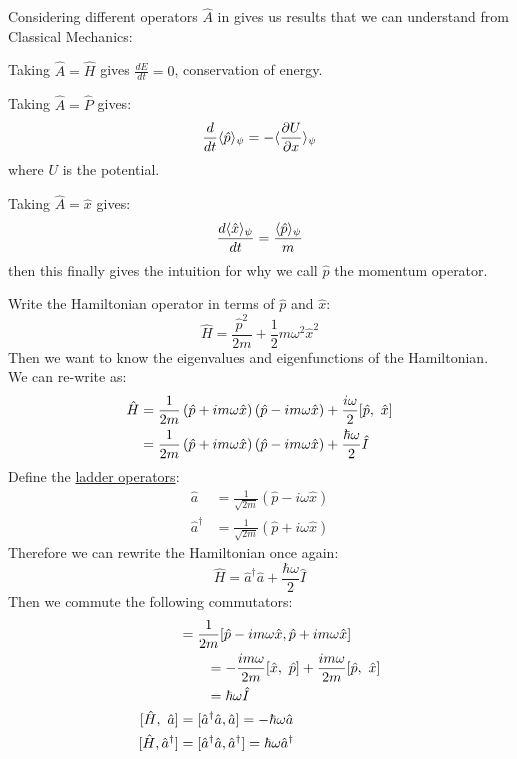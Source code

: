 \documentclass[../Main.tex]{subfiles}
\begin{document}
\begin{examples}{
        Considering different operators $\hat{A}$ in  gives us results that we can understand from Classical Mechanics:
    }
    \item Taking $\hat{A} = \hat{H}$ gives $\frac{dE}{dt} = 0$, conservation of energy.
    \item Taking $\hat{A} = \hat{P}$ gives:
        \begin{equation*}
            \frac{d}{dt} \langle \hat{p} \rangle_\psi = -\langle \frac{\partial U}{\partial x} \rangle_\psi
        \end{equation*}
        where $U$ is the potential.
    \item Taking $\hat{A} = \hat{x}$ gives:
        \begin{equation*}
            \frac{d\langle \hat{x} \rangle_\psi}{dt} = \frac{\langle \hat{p} \rangle_\psi}{m}
        \end{equation*}
        then this finally gives the intuition for why we call $\hat{p}$ the momentum operator.
\end{examples}
Write the Hamiltonian operator in terms of $\hat{p}$ and $\hat{x}$:
\begin{equation*}
    \hat{H} = \frac{\hat{p}^2}{2m} + \frac12 m \omega^2 \hat{x}^2
\end{equation*}
Then we want to know the eigenvalues and eigenfunctions of the Hamiltonian. We can re-write as:
\begin{align*}
    \hat{H} &= \frac{1}{2m}\left(\hat{p} + i m \omega \hat{x}\right)(\hat{p} - i m \omega \hat{x}) + \frac{i \omega}{2} [\hat{p},~\hat{x}] \\
    &= \frac{1}{2m}\left(\hat{p} + i m \omega \hat{x}\right)(\hat{p} - i m \omega \hat{x}) + \frac{\hbar \omega}{2} \hat{I}
\end{align*}
Define the \underline{ladder operators}:
\begin{align*}
    \hat{a} &= \frac{1}{\sqrt{2m}} (\hat{p} - i \omega \hat{x}) \\
    \hat{a}^\dagger &= \frac{1}{\sqrt{2m}} (\hat{p} + i \omega \hat{x})
\end{align*}    
Therefore we can rewrite the Hamiltonian once again:
\begin{equation*}
    \hat{H} = \hat{a}^\dagger \hat{a} + \frac{\hbar \omega}{2} \hat{I}
\end{equation*}
Then we commute the following commutators:
\begin{align*}
    [\hat{a}, \hat{a}^\dagger] &= \frac{1}{2m} [\hat{p} - i m \omega \hat{x}, \hat{p} + i m \omega \hat{x}] \\
    &\qquad= -\frac{i m \omega}{2m} \cmmt{x}{p} + \frac{i m \omega}{2m} \cmmt{p}{x} \\
    &\qquad= \hbar \omega \hat{I} \\
    \cmmt{H}{a} &= [\hat{a}^\dagger \hat{a}, \hat{a}] = -\hbar \omega \hat{a} \\
    [\hat{H}, \hat{a}^\dagger] &= [\hat{a}^\dagger \hat{a}, \hat{a}^\dagger] = \hbar \omega \hat{a}^\dagger
\end{align*}
\end{document}
